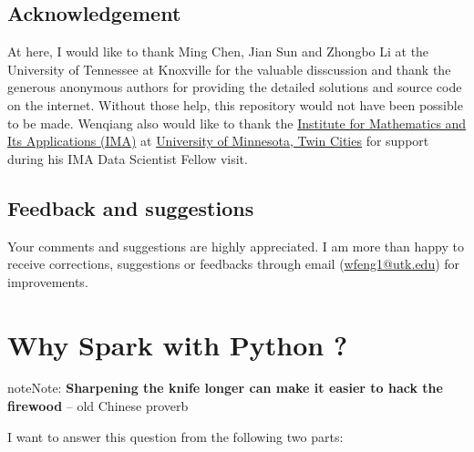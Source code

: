 \documentclass[letterpaper,11pt,english]{sphinxmanual}
\begin{document}
\section{Acknowledgement}
\label{preface:acknowledgement}
At here, I would like to thank Ming Chen, Jian Sun and Zhongbo Li at the
University of Tennessee at Knoxville for the valuable disscussion
and thank the generous anonymous authors for providing the detailed
solutions and source code on the internet. Without those help,
this repository would not have been possible to be made. Wenqiang
also would like to thank the \href{https://www.ima.umn.edu/}{Institute for Mathematics and Its
Applications (IMA)} at \href{https://twin-cities.umn.edu/}{University of Minnesota, Twin Cities}
for support during his IMA Data Scientist Fellow visit.


\section{Feedback and suggestions}
\label{preface:feedback-and-suggestions}
Your comments and suggestions are highly appreciated. I am more
than happy to receive corrections, suggestions or feedbacks through
email (\href{mailto:wfeng1@utk.edu}{wfeng1@utk.edu}) for improvements.


\chapter{Why Spark with Python ?}
\label{why:university-of-minnesota-twin-cities}\label{why::doc}\label{why:why}\label{why:why-spark-with-python}
\begin{notice}{note}{Note:}
\textbf{Sharpening the knife longer can make it easier to hack the firewood} -- old Chinese proverb
\end{notice}

I want to answer this question from the following two parts:
\end{document}

